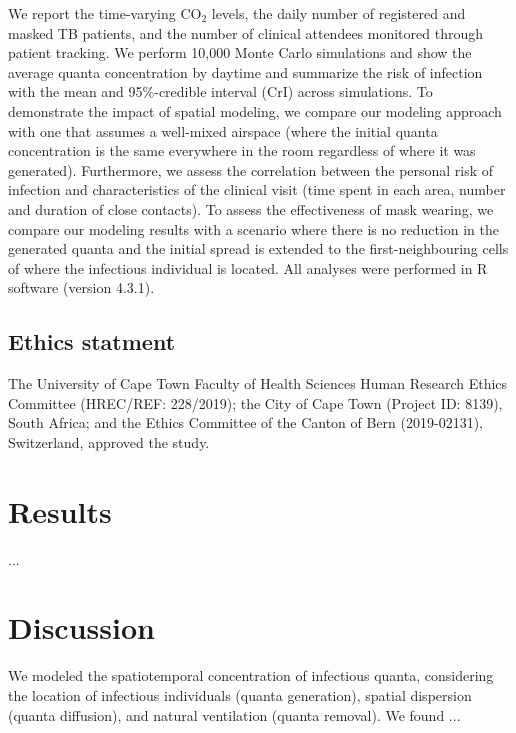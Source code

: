 \documentclass[fleqn,11pt]{wlscirep}
\begin{document}
We report the time-varying CO$_2$ levels, the daily number of registered and masked TB patients, and the number of clinical attendees monitored through patient tracking. We perform 10,000 Monte Carlo simulations and show the average quanta concentration by daytime and summarize the risk of infection with the mean and 95\%-credible interval (CrI) across simulations. To demonstrate the impact of spatial modeling, we compare our modeling approach with one that assumes a well-mixed airspace (\ie where the initial quanta concentration is the same everywhere in the room regardless of where it was generated). Furthermore, we assess the correlation between the personal risk of infection and characteristics of the clinical visit (time spent in each area, number and duration of close contacts). To assess the effectiveness of mask wearing, we compare our modeling results with a scenario where there is no reduction in the generated quanta and the initial spread is extended to the first-neighbouring cells of where the infectious individual is located. All analyses were performed in R software (version 4.3.1)\cite{RCoreTeam2023}.


\subsection{Ethics statment}

The University of Cape Town Faculty of Health Sciences Human Research Ethics Committee (HREC/REF: 228/2019); the City of Cape Town (Project ID: 8139), South Africa; and the Ethics Committee of the Canton of Bern (2019-02131), Switzerland, approved the study.

\newpage

\section{Results}

...


\FloatBarrier

\newpage

\section{Discussion}

We modeled the spatiotemporal concentration of infectious quanta, considering the location of infectious individuals (quanta generation), spatial dispersion (quanta diffusion), and natural ventilation (quanta removal). We found ... 
\end{document}

